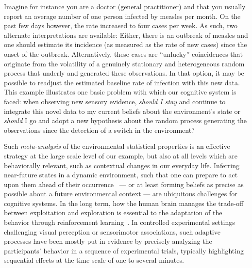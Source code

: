 \documentclass[12pt,english]{article}%
\newcommand{\citep}[1]{\parencite{#1}}
\begin{document}
Imagine for instance you are a doctor (general practitioner) and
that you usually report an average number of
one person infected by measles per month.
On the past few days however,
the rate increased to four cases per week.
As such, two alternate interpretations are available:
Either, there is an outbreak of measles and
one should estimate its incidence
(as measured as the rate of new cases)
since the onset of the outbreak.
Alternatively, these cases are
``unlucky'' coincidences that originate from the volatility
of a genuinely stationary and heterogeneous random process
that underly and generated these observations.
In that option, it may be possible to readjust the estimated baseline rate of infection
with this new data.
This example illustrates one basic problem with which our cognitive system is faced:
when observing new sensory evidence,
\emph{should I stay} and continue to integrate this novel data
to my current beliefs about the environment's state
or \emph{should} I go and adopt a new hypothesis
about the random process generating the observations
since the detection of a switch in the environment?

Such \emph{meta-analysis} of the environmental statistical properties is an effective strategy at the large scale level of our example,
but also at all levels which are behaviorally relevant,
such as contextual changes in our everyday life.
Inferring near-future states in a dynamic environment, such that one can prepare to act upon them ahead of their occurrence~\citep{PerrinetAdamasFriston2014} ---
or at least forming beliefs as precise as possible
about a future environmental context ---
are ubiquitous challenges for cognitive systems.
In the long term, how the human brain manages
the trade-off between exploitation and exploration
is essential to the adaptation
of the behavior through reinforcement learning~\citep{Cohen2007}.
In controlled experimental settings challenging visual perception or sensorimotor associations,
such adaptive processes have been mostly put in evidence
by precisely analyzing the participants' behavior in a sequence of experimental trials,
typically highlighting sequential effects
at the time scale of one to several minutes.
\end{document}
